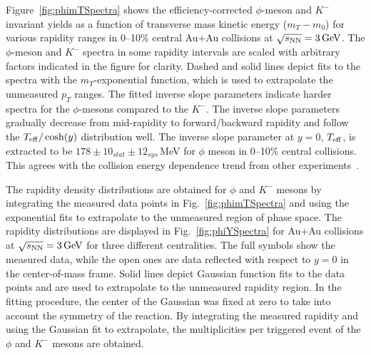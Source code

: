 \documentclass[%
 reprint,	
showpacs,
 amsmath,amssymb,
 aps,
 prc,
]{revtex4-1}
\begin{document}
Figure~\ref{fig:phimTSpectra} shows the efficiency-corrected $\phi$-meson and $K^-$ invariant yields as a function of transverse mass kinetic energy ($m_T-m_0$) for various rapidity ranges in 0--10\% central Au+Au collisions at ${\sqrt{s_{\rm NN}} = \rm{3\,GeV}}$. The $\phi$-meson and $K^-$ spectra in some rapidity intervals are scaled with arbitrary factors indicated in the figure for clarity. Dashed and solid lines depict fits to the spectra with the $m_T$-exponential function, which is used to extrapolate the unmeasured $p_T$ ranges. The fitted inverse slope parameters indicate harder spectra for the $\phi$-mesons compared to the $K^-$. The inverse slope parameters gradually decrease from mid-rapidity to forward/backward rapidity and follow the $T_{\rm eff}/\cosh(y)$ distribution well. The inverse slope parameter at $y=0$, $T_{\rm eff}$, is extracted to be $178\pm10_{stat}\pm12_{sys}$\,MeV for $\phi$ meson in 0--10\% central collisions. This agrees with the collision energy dependence trend from other experiments~\cite{HADES_phi_AuAu,FOPI_phi_NiNi,FOPI_phi_AlAl,HADES_phi_ArKCl,NA49_phi}.


The rapidity density distributions are obtained for $\phi$ and $K^-$ mesons by integrating the measured data points in Fig.~\ref{fig:phimTSpectra} and using the exponential fits to extrapolate to the unmeasured region of phase space. The rapidity distributions are displayed in Fig.~\ref{fig:phiYSpectra} for Au+Au collisions at ${\sqrt{s_{\rm NN}} = \rm{3\,GeV}}$ for three different centralities. The full symbols show the measured data, while the open ones are data reflected with respect to $y=0$ in the center-of-mass frame. Solid lines depict Gaussian function fits to the data points and are used to extrapolate to the unmeasured rapidity region. In the fitting procedure, the center of the Gaussian was fixed at zero to take into account the symmetry of the reaction. By integrating the measured rapidity and using the Gaussian fit to extrapolate, the multiplicities per triggered event of the $\phi$ and $K^-$ mesons are obtained.
\end{document}
